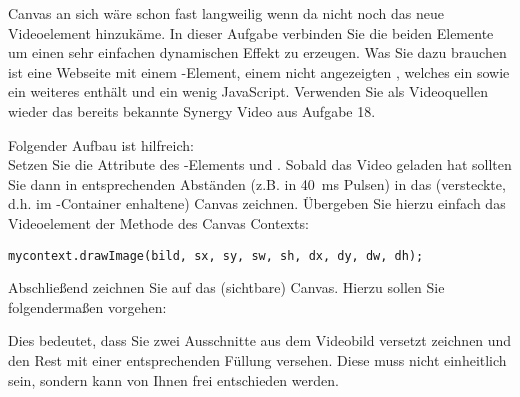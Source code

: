 %
\par Canvas an sich wäre schon fast langweilig wenn da nicht noch das neue
Videoelement hinzukäme. In dieser Aufgabe verbinden Sie die beiden Elemente um
einen sehr einfachen dynamischen Effekt zu erzeugen. Was Sie dazu brauchen ist
eine Webseite mit einem -Element, einem nicht angezeigten
, welches ein  sowie ein weiteres  enthält und
ein wenig JavaScript. Verwenden Sie als Videoquellen wieder das bereits
bekannte Synergy Video aus Aufgabe 18.
%
\par Folgender Aufbau ist hilfreich: \\Setzen Sie die Attribute des
-Elements  und . Sobald das
Video geladen hat sollten Sie dann in entsprechenden Abständen (z.B. in
\qty{40}{ms} Pulsen) in das (versteckte, d.h. im -Container
enhaltene) Canvas zeichnen. Übergeben Sie hierzu einfach das Videoelement der
 Methode des Canvas Contexts:
%
\begin{lstlisting}
mycontext.drawImage(bild, sx, sy, sw, sh, dx, dy, dw, dh);
\end{lstlisting}
%
\par Abschließend zeichnen Sie auf das (sichtbare) Canvas. Hierzu sollen Sie
folgendermaßen vorgehen:
%


\par Dies bedeutet, dass Sie zwei Ausschnitte aus dem Videobild versetzt
zeichnen und den Rest mit einer entsprechenden Füllung versehen. Diese muss
nicht einheitlich sein, sondern kann von Ihnen frei entschieden werden.